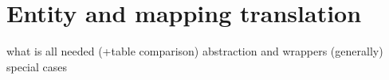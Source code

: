 \chapter{Entity and mapping translation}
what is all needed (+table comparison)
abstraction and wrappers (generally)
special cases